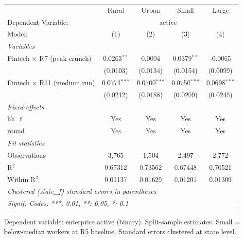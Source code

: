 
\begingroup
\centering
\begin{tabular}{lcccc}
   \tabularnewline \midrule \midrule
                                      & Rural          & Urban          & Small          & Large \\   
   Dependent Variable: & \multicolumn{4}{c}{active}\\
   Model:                             & (1)            & (2)            & (3)            & (4)\\  
   \midrule
   \emph{Variables}\\
   Fintech $\times$ R7 (peak crunch)  & 0.0263$^{**}$  & 0.0004         & 0.0379$^{**}$  & -0.0065\\   
                                      & (0.0103)       & (0.0134)       & (0.0154)       & (0.0099)\\   
   Fintech $\times$ R11 (medium run)  & 0.0771$^{***}$ & 0.0700$^{***}$ & 0.0750$^{***}$ & 0.0698$^{***}$\\   
                                      & (0.0212)       & (0.0188)       & (0.0209)       & (0.0245)\\   
   \midrule
   \emph{Fixed-effects}\\
   hh\_f                              & Yes            & Yes            & Yes            & Yes\\  
   round                              & Yes            & Yes            & Yes            & Yes\\  
   \midrule
   \emph{Fit statistics}\\
   Observations                       & 3,765          & 1,504          & 2,497          & 2,772\\  
   R$^2$                              & 0.67312        & 0.73562        & 0.67448        & 0.70521\\  
   Within R$^2$                       & 0.01137        & 0.01629        & 0.01201        & 0.01309\\  
   \midrule \midrule
   \multicolumn{5}{l}{\emph{Clustered (state\_f) standard-errors in parentheses}}\\
   \multicolumn{5}{l}{\emph{Signif. Codes: ***: 0.01, **: 0.05, *: 0.1}}\\
\end{tabular}
 
\par \raggedright 
Dependent variable: enterprise active (binary). Split-sample estimates. Small = below-median workers at R5 baseline. Standard errors clustered at state level.
\par\endgroup


